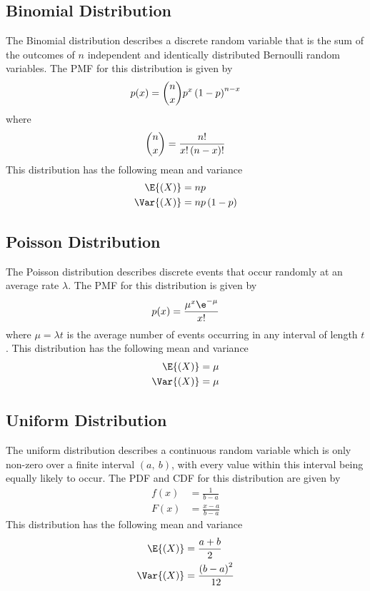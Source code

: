 \documentclass{article}
\begin{document}
\subsection{Binomial Distribution}
The Binomial distribution describes a discrete random variable that is the sum of the outcomes of $n$
independent and identically distributed Bernoulli random variables.
The PMF for this distribution is given by
\begin{equation*}
    p(x) = \dbinom{n}{x} p^x \left( 1 - p \right)^{n - x}
\end{equation*}
where
\begin{equation*}
    \dbinom{n}{x} = \frac{n!}{x!\left( n - x \right)!}
\end{equation*}
This distribution has the following mean and variance
\begin{align*}
    \E{\left( X \right)}   & = np                     \\
    \Var{\left( X \right)} & = np\left( 1 - p \right)
\end{align*}
\subsection{Poisson Distribution}
The Poisson distribution describes discrete events that occur randomly at an average rate $\lambda$.
The PMF for this distribution is given by
\begin{equation*}
    p(x) = \frac{\mu^x\e^{-\mu}}{x!}
\end{equation*}
where $\mu = \lambda t$ is the average number of events occurring in any interval of length $t$.
This distribution has the following mean and variance
\begin{align*}
    \E{\left( X \right)}   & = \mu \\
    \Var{\left( X \right)} & = \mu
\end{align*}
\subsection{Uniform Distribution}
The uniform distribution describes a continuous random variable which is only non-zero over a finite interval $\left( a,\: b \right)$,
with every value within this interval being equally likely to occur. The PDF and CDF for this distribution are given by
\begin{align*}
    f(x) & = \frac{1}{b - a}     \\
    F(x) & = \frac{x - a}{b - a}
\end{align*}
This distribution has the following mean and variance
\begin{align*}
    \E{\left( X \right)}   & = \frac{a + b}{2}                   \\
    \Var{\left( X \right)} & = \frac{\left( b - a \right)^2}{12}
\end{align*}
\end{document}
